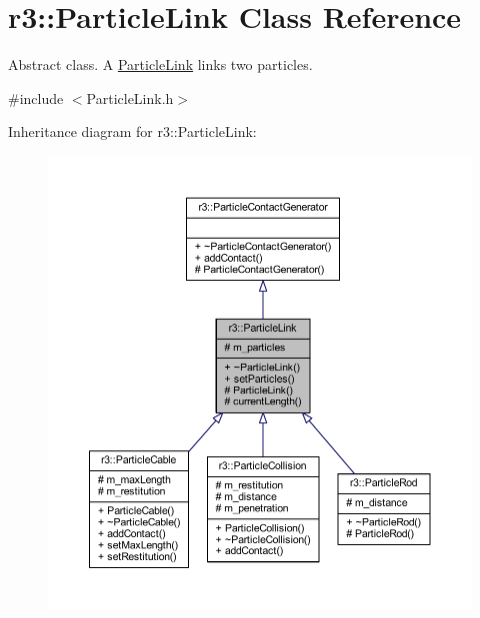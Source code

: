 \hypertarget{classr3_1_1_particle_link}{}\section{r3\+:\+:Particle\+Link Class Reference}
\label{classr3_1_1_particle_link}


Abstract class. A \mbox{\hyperlink{classr3_1_1_particle_link}{Particle\+Link}} links two particles.  




{\ttfamily \#include $<$Particle\+Link.\+h$>$}



Inheritance diagram for r3\+:\+:Particle\+Link\+:\nopagebreak
\begin{figure}[H]
\begin{center}
\leavevmode
\includegraphics[width=350pt]{classr3_1_1_particle_link__inherit__graph}
\end{center}
\end{figure}



